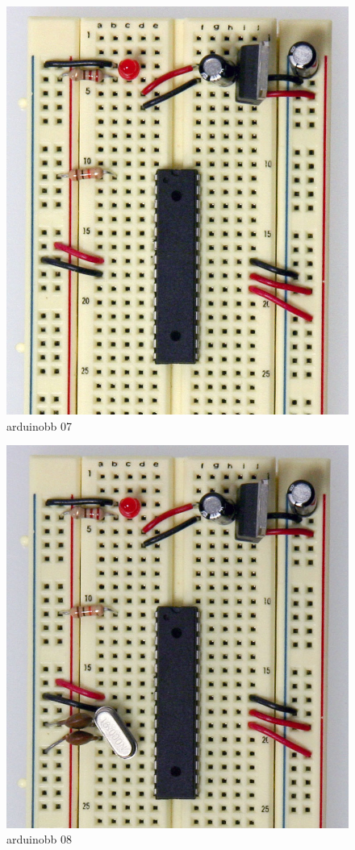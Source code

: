 \begin{figure}[!htb]
 \centering
 \includegraphics[scale=0.3]{img/arduino_breadboard/arduinobb_07.jpg}
 \caption{arduinobb 07}
 \label{arduinobb 07}
\end{figure}


\begin{figure}[!htb]
 \centering
 \includegraphics[scale=0.3]{img/arduino_breadboard/arduinobb_08.jpg}
 \caption{arduinobb 08}
 \label{arduinobb 08}
\end{figure}


